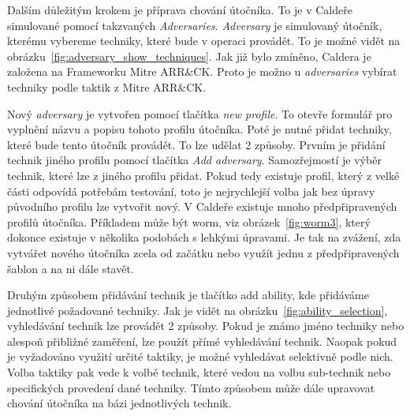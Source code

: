 
Dalším důležitým krokem je příprava chování útočníka.
To je v Caldeře simulované pomocí takzvaných \textit{Adversaries}.
\textit{Adversary} je simulovaný útočník, kterému vybereme techniky, které bude v operaci provádět.
To je možné vidět na obrázku~\ref{fig:adversary_show_techniques}.
Jak již bylo zmíněno, Caldera je založena na Frameworku Mitre ARR\&CK\@.
Proto je možno u \textit{adversaries} vybírat techniky podle taktik z Mitre ARR\&CK\@.


\noindent
Nový \textit{adversary} je vytvořen pomocí tlačítka \textit{new profile}.
To otevře formulář pro vyplnění názvu a popisu tohoto profilu útočníka.
Poté je nutné přidat techniky, které bude tento útočník provádět.
To lze udělat 2 způsoby.
Prvním je přidání  technik jiného profilu pomocí tlačítka \textit{Add adversary}.
Samozřejmostí je výběr technik, které lze z jiného profilu přidat.
Pokud tedy existuje profil, který z velké části odpovídá potřebám testování, toto je nejrychlejší volba jak bez úpravy původního profilu lze vytvořit nový.
V Caldeře existuje mnoho předpřipravených profilů útočníka.
Příkladem může být worm, viz obrázek~\ref{fig:worm3}, který dokonce existuje v několika podobách s lehkými úpravami.
Je tak na zvážení, zda vytvářet nového útočníka zcela od začátku nebo využít jednu z předpřipravených šablon a na ni dále stavět.



Druhým způsobem přidávání technik je tlačítko add ability, kde přidáváme jednotlivé požadované techniky.
Jak je vidět na obrázku~\ref{fig:ability_selection}, vyhledávání technik lze provádět 2 způsoby.
Pokud je známo jméno techniky nebo alespoň přibližné zaměření, lze použít přímé vyhledávání technik.
Naopak pokud je vyžadováno využití určité taktiky, je možné vyhledávat selektivně podle nich.
Volba taktiky pak vede k volbě technik, které vedou na volbu sub-technik nebo specifických provedení dané techniky.
Tímto způsobem může dále upravovat chování útočníka na bázi jednotlivých technik.


